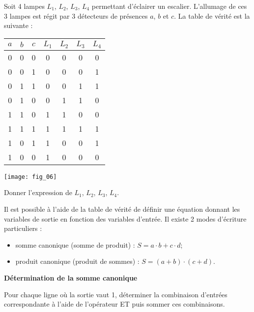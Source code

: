 \begin{exemple}
Soit 4 lampes $L_1$, $L_2$, $L_3$, $L_4$ permettant d'éclairer un escalier. L'allumage de ces 3 lampes est régit par 3 détecteurs de présences $a$, $b$ et $c$. La table de vérité est la suivante :

\begin{minipage}[c]{.4\linewidth}
\begin{center}
\begin{tabular}[c]{|c|c|c||c|c|c|c|}
\hline 
$a$ & $b$ & $c$ & $L_1$ & $L_2$ & $L_3$ & $L_4$ \\
\hline \hline
0 & 0 & 0 & 0 & 0 & 0 & 0 \\ \hline
0 & 0 & 1 & 0 & 0 & 0 & 1 \\ \hline
0 & 1 & 1 & 0 & 0 & 1 & 1 \\ \hline
0 & 1 & 0 & 0 & 1 & 1 & 0 \\ \hline
1 & 1 & 0 & 1 & 1 & 0 & 0 \\ \hline
1 & 1 & 1 & 1 & 1 & 1 & 1 \\ \hline
1 & 0 & 1 & 1 & 0 & 0 & 1 \\ \hline
1 & 0 & 0 & 1 & 0 & 0 & 0 \\ \hline 
\end{tabular}
\end{center}
\end{minipage}
\begin{minipage}[c]{.55\linewidth}
\begin{center}
\texttt{[image: fig\_06]}
\end{center}
\end{minipage}

Donner l'expression de $L_1$, $L_2$, $L_3$, $L_4$.
\end{exemple}

Il est possible à l'aide de la table de vérité de définir une équation donnant les variables de sortie en fonction des variables d'entrée. Il existe 2 modes d'écriture particuliers : 
\begin{itemize}
\item somme canonique (somme de produit) : $S=a\cdot b + c\cdot d$;
\item produit canonique (produit de sommes) : $S=(a+b) \cdot (c+d)$.
\end{itemize}

\begin{methode}
\textbf{Détermination de la somme canonique}

Pour chaque ligne où la sortie vaut 1, déterminer la combinaison d'entrées correspondante à l'aide de l'opérateur ET puis sommer ces combinaisons. 
\end{methode}



